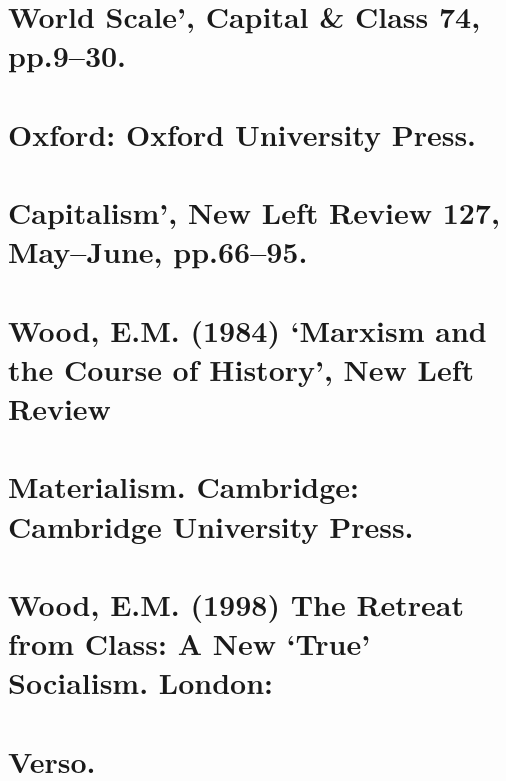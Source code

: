 \section{World Scale’, Capital & Class 74, pp.9–30.}


\section{Oxford: Oxford University Press.}


\section{Capitalism’, New Left Review 127, May–June, pp.66–95.}


\section{Wood, E.M. (1984) ‘Marxism and the Course of History’, New Left Review}


\section{Materialism. Cambridge: Cambridge University Press.}


\section{Wood, E.M. (1998) The Retreat from Class: A New ‘True’ Socialism. London:}


\section{Verso.}